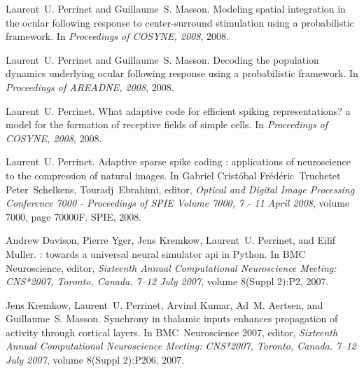 \documentclass[11pt,french,a4paper,oneside]{article}%
\begin{document}
\begin{etaremune}
\item %
Laurent~U. Perrinet and Guillaume~S. Masson.
\newblock Modeling spatial integration in the ocular following response to
  center-surround stimulation using a probabilistic framework.
\newblock In \emph{Proceedings of COSYNE, 2008}, 2008.

\item %
Laurent~U. Perrinet and Guillaume~S. Masson.
\newblock Decoding the population dynamics underlying ocular following response
  using a probabilistic framework.
\newblock In \emph{Proceedings of AREADNE, 2008}, 2008.

\item %
Laurent~U. Perrinet.
\newblock What adaptive code for efficient spiking representations? a model for
  the formation of receptive fields of simple cells.
\newblock In \emph{Proceedings of COSYNE, 2008}, 2008.

\item %
Laurent~U. Perrinet.
\newblock Adaptive sparse spike coding : applications of neuroscience to the
  compression of natural images.
\newblock In Gabriel Crist{\'o}bal Fr{\'e}d{\'e}ric~Truchetet Peter~Schelkens,
  Touradj~Ebrahimi, editor, \emph{Optical and Digital Image Processing
  Conference 7000 - Proceedings of SPIE Volume 7000, 7 - 11 April 2008}, volume
  7000, page 70000F. SPIE, 2008.


\item %
Andrew Davison, Pierre Yger, Jens Kremkow, Laurent~U. Perrinet, and Eilif
  Muller.
: towards a universal neural simulator api in {P}ython.
\newblock In BMC Neuroscience, editor, \emph{Sixteenth Annual Computational
  Neuroscience Meeting: CNS*2007, Toronto, Canada. 7--12 July 2007}, volume
  8(Suppl 2):P2, 2007.


\item %
Jens Kremkow, Laurent~U. Perrinet, Arvind Kumar, Ad~M. Aertsen, and
  Guillaume~S. Masson.
\newblock Synchrony in thalamic inputs enhances propagation of activity through
  cortical layers.
\newblock In BMC~Neuroscience 2007, editor, \emph{Sixteenth Annual
  Computational Neuroscience Meeting: CNS*2007, Toronto, Canada. 7--12 July
  2007}, volume 8(Suppl 2):P206, 2007.



\end{etaremune}
\end{document}
